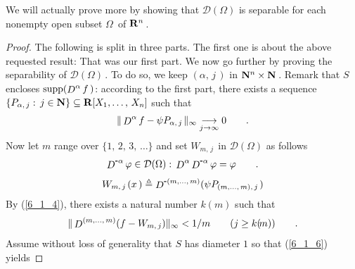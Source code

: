 %
%
We will actually prove more by showing that $\mathcal{D}(\Omega)$ is separable for each nonempty open subset $\Omega\,$ of %
$\mathbf{R}^n\,$.
%
\begin{proof}
The following is split in three parts. The first one is about the above requested result: That was our first part. We now go %
further by proving the separability of $\mathcal{D}(\Omega)\,$. To do so, we keep $(\alpha,\, j\,)$ in $\mathbf{N}^n\times \mathbf{N}\,$. %
Remark that $S$ encloses $\text{supp}(\deriv[\alpha]{f}\,) $: according to the first part, there exists a sequence %
$\{ P_{\alpha,\, j}:\, j\in \mathbf{N} \} \subseteq\mathbf{R} [X_1,\dotsc ,\, X_n]$ such that
%
\begin{align}\label{6_1_4}
  \| \deriv[\alpha]{f}- \psi P_{\alpha,\, j \,} \|_\infty \underset{j\to\infty}{\longrightarrow} 0 \qquad .
\end{align}
%
Now let $m$ range over $\{1,\, 2,\,3,\, \dots\}$ and set $W_{m,\, j\,}$ in $\mathcal{D}(\Omega)$ as follows
%
\begin{align}\label{6_1_5a}
  \deriv[\minus \alpha]{\phi} \in \mathcal{D}(\Omega):\, \deriv[\alpha]{\deriv[\minus \alpha]{\phi}}= \phi\qquad .
\end{align}
%
%
\begin{align}\label{6_1_5}
  W_{m,\, j\,}(x\,)\Def \deriv[\minus (m,\dotsc,\,m)] ( \psi P_{(m,\dotsc, \, m),\, j\,})
\end{align}
%
By (\ref{6_1_4}), there exists a natural number $k(\!m)$ such that
%
\begin{align}\label{6_1_6}
  \|\deriv[(m,\dotsc,\, m)] (f -W_{m,\, j}) \|_\infty < 1/m \qquad (j\geq k(\!m) )\qquad .
\end{align}
%
Assume without loss of generality that $S$ has diameter $1$ so that (\ref{6_1_6}) yields

\end{proof}
